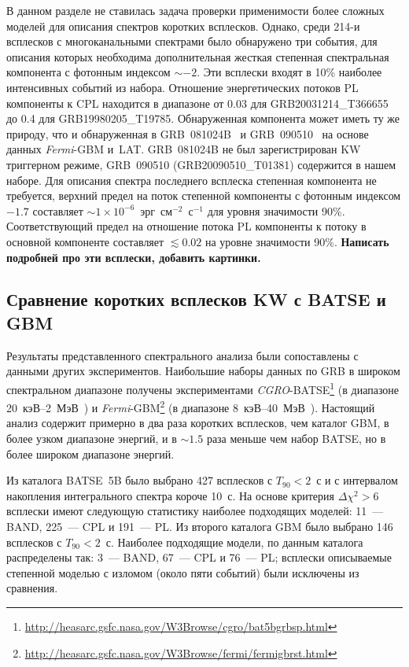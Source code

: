 В данном разделе не ставилась задача проверки применимости более сложных моделей
для описания спектров коротких всплесков.
Однако, среди 214-и всплесков с многоканальными спектрами было обнаружено три
события, для описания которых необходима дополнительная жесткая степенная 
спектральная компонента с фотонным индексом $\sim -2$. Эти всплески входят в 10\%
наиболее интенсивных событий из набора. Отношение энергетических потоков PL
компоненты к CPL находится в диапазоне от 0.03 для GRB20031214\_T366655 до
0.4 для GRB19980205\_T19785. Обнаруженная компонента может иметь ту же природу,
что и обнаруженная в GRB~081024B~\citep{Abdo_2010ApJ_712_558A} и 
GRB~090510~\citep{Ackermann_2010ApJ_716_1178A} на основе данных \textit{Fermi}-GBM и~LAT.
GRB~081024B не был зарегистрирован KW триггерном режиме, GRB~090510 (GRB20090510\_T01381)
содержится в нашем наборе. Для описания спектра последнего всплеска степенная 
компонента не требуется, верхний предел на поток степенной компоненты с фотонным 
индексом $-1.7$ составляет $\sim 1 \times 10^{-6}$~эрг~см$^{-2}$~с$^{-1}$ для 
уровня значимости 90\%. Соответствующий предел на отношение потока PL компоненты 
к потоку в основной компоненте составляет $\lesssim 0.02$ на уровне значимости 90\%.
\textbf{Написать подробней про эти всплески, добавить картинки.}

\subsection{Сравнение коротких всплесков KW с BATSE и GBM}
Результаты представленного спектрального анализа были сопоставлены с данными
других экспериментов.
Наибольшие наборы данных по GRB в широком спектральном диапазоне получены экспериментами
\textit{CGRO}-BATSE\footnote{\url{http://heasarc.gsfc.nasa.gov/W3Browse/cgro/bat5bgrbsp.html}}
(в диапазоне 20~кэВ--2~МэВ~\citep{Goldstein_2013ApJS}) и 
\textit{Fermi}-GBM\footnote{\url{http://heasarc.gsfc.nasa.gov/W3Browse/fermi/fermigbrst.html}}
(в диапазоне 8~кэВ--40~МэВ~\citep{Gruber_2014ApJS}). 
Настоящий анализ содержит примерно в два раза коротких всплесков, чем каталог GBM, 
в более узком диапазоне энергий, и в $\sim 1.5 $ раза меньше чем набор BATSE, 
но в более широком диапазоне энергий.

Из каталога BATSE~5B было выбрано 427 всплесков с $T_{90}<2$~с и с интервалом 
накопления интегрального спектра короче 10~с. На основе критерия $\Delta \chi^2>6$
всплески имеют следующую статистику наиболее подходящих моделей:
11~--- BAND, 225~--- CPL и 191~--- PL.
Из второго каталога GBM было выбрано 146 всплесков с $T_{90}<2$~с. Наиболее подходящие модели,
по данным каталога распределены так: 3~--- BAND, 67~--- CPL и 76~--- PL;
всплески описываемые степенной моделью с изломом (около пяти событий) были 
исключены из сравнения.

